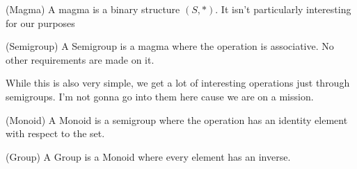  (Magma) A magma is a binary structure \((S, *)\). It isn't particularly interesting for our purposes

 (Semigroup) A Semigroup is a magma where the operation is associative. No other requirements are made on it.

While this is also very simple, we get a lot of interesting operations just through semigroups. I'm not gonna go into them here cause we are on a mission.

 (Monoid) A Monoid is a semigroup where the operation has an identity element with respect to the set.

 (Group) A Group is a Monoid where every element has an inverse.